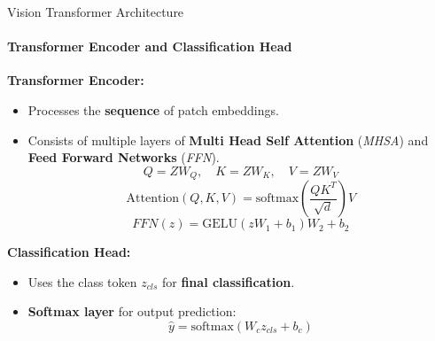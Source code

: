 \begin{frame}[fragile]{Vision Transformer Architecture}
  \framesubtitle{Transformer Encoder and Classification Head}
  \textbf{Transformer Encoder:}
  \begin{itemize}
    \item Processes the \textbf{sequence} of patch embeddings.
    \item Consists of multiple layers of \textbf{Multi Head Self Attention} (\textit{MHSA}) and \textbf{Feed Forward Networks} (\textit{FFN}).
      \begin{equation}
        Q = Z W_Q, \quad K = Z W_K, \quad V = Z W_V
      \end{equation}
      \begin{equation}
        \text{Attention}(Q, K, V) = \text{softmax} \left( \frac{QK^T}{\sqrt{d}} \right) V
      \end{equation}
      \begin{equation}
        FFN(z) = \text{GELU} (zW_1 + b_1) W_2 + b_2
      \end{equation}
    \end{itemize}

  \textbf{Classification Head:}
  \begin{itemize}
    \item Uses the class token $ z_{cls} $ for \textbf{final classification}.
    \item \textbf{Softmax layer} for output prediction:
      \begin{equation}
        \hat{y} = \text{softmax} (W_c z_{cls} + b_c)
      \end{equation}
  \end{itemize}
\end{frame}

